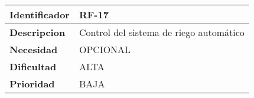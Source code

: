 \begin{center}
    \begin{tabular}{|p{2.6cm}|p{12cm}|}
    \hline
    \textbf{Identificador} & RF-17\\
    \hline
    \textbf{Descripcion} & Control del sistema de riego automático\\
    \hline
    \textbf{Necesidad} & OPCIONAL\\
    \hline
    \textbf{Dificultad} & ALTA\\
    \hline
    \textbf{Prioridad} & BAJA\\
    \hline
    \end{tabular}
\end{center}
